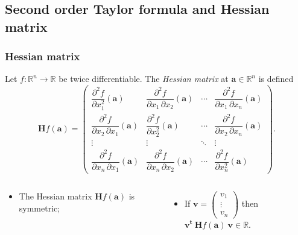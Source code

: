 \documentclass[aspectratio=169,handout]{beamer}
\newcommand{\bR}{\mathbb{R}} %
\renewcommand{\aa}{\mathbf{a}}
\newcommand{\vv}{\mathbf{v}}
\begin{document}
\subsection{Second order Taylor formula and Hessian matrix}


\begin{frame}
    \frametitle{Hessian matrix}


    \begin{definition}
        Let \(f:\bR^n \to\bR\) be twice differentiable.
        The \emph{Hessian matrix} at \(\aa\in \bR^n\) is defined
        \[
            \mathbf{H} f (\aa)= \begin{pmatrix}
                \dfrac{\partial^2 f}{\partial x_1^2} (\aa)
                 & \dfrac{\partial^2 f}{\partial x_1\,\partial x_2} (\aa)
                 & \cdots
                 & \dfrac{\partial^2 f}{\partial x_1\,\partial x_n}(\aa)  \\[2.2ex]
                \dfrac{\partial^2 f}{\partial x_2\,\partial x_1} (\aa)
                 & \dfrac{\partial^2 f}{\partial x_2^2}(\aa)
                 & \cdots
                 & \dfrac{\partial^2 f}{\partial x_2\,\partial x_n}(\aa)  \\[2.2ex]
                \vdots
                 & \vdots
                 & \ddots
                 & \vdots                                                 \\[2.2ex]
                \dfrac{\partial^2 f}{\partial x_n\,\partial x_1} (\aa)
                 & \dfrac{\partial^2 f}{\partial x_n\,\partial x_2} (\aa)
                 & \cdots
                 & \dfrac{\partial^2 f}{\partial x_n^2}(\aa)
            \end{pmatrix}.
        \]
    \end{definition}


    \begin{columns}
        \begin{column}{.5\textwidth}
            \begin{itemize}
                \item The Hessian matrix \(\mathbf{H} f (\aa)\) is symmetric;
            \end{itemize}

        \end{column}
        \begin{column}{.5\textwidth}
            \begin{itemize}
                \item If \(\vv= \left( \begin{smallmatrix}
                              v_1\\ \vdots \\v_n
                          \end{smallmatrix} \right)  \) then \(\vv^{\mathbf{t}} \ \mathbf{H} f (\aa) \ \vv \in \bR\).
            \end{itemize}

        \end{column}
    \end{columns}

\end{frame}
\end{document}
